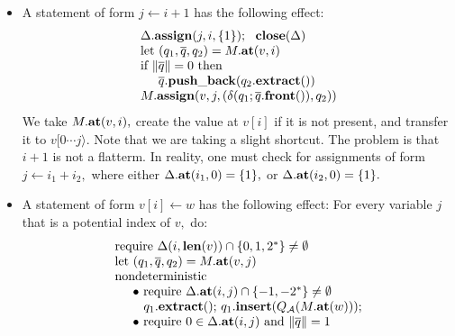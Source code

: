 \begin{itemize}
   If the triple at $ M. {\bf at}(v,i) $ has a value for
   $ v[i], $ we can use it. Otherwise, we create it first. 
\item
   A statement of form $ j \leftarrow i + 1 $ has the following effect:
   \[
      \begin{array}{l}
      \Delta. {\bf assign}( j,i, \{ 1 \} ); \ \ {\bf close}( \Delta ) \\
      {\rm let} \ ( q_1, \overline{q}, q_2 ) = M. {\bf at}(v,i) \\
      \mbox{if} \ \| \overline{q} \| = 0 \ \mbox{then} \\
      \hspace*{0.5cm} \overline{q}. {\bf push\_back}( q_2. {\bf extract}( )) \\
      M. {\bf assign}( v,j, ( \delta( q_1; \overline{q}. {\bf front}()), q_2 )) \\ 
      \end{array}
   \] 
   We take $ M.{\bf at}(v,i), $ create the value at $ v[i] $ if it is not
   present, and transfer it to $ v[ 0 \cdots j \rangle. $ 
   Note that we are taking a slight shortcut.
   The problem is that $ i + 1 $ is not a flatterm.
   In reality, one must check for assignments of form
   $ j \leftarrow i_1 + i_2, $ where either
   $ \Delta.{\bf at}(i_1,0) = \{ 1 \}, $ or
   $ \Delta.{\bf at}(i_2,0) = \{ 1 \}. $ 
\item
   A statement of form $ v[i] \leftarrow w $ has the following effect:
   For every variable $ j $ that is a potential index of $ v, $ do: 
   \[ 
      \begin{array}{l} 
         {\rm require} \ \Delta(i, {\bf len}(v)) \cap \{ 0,1,2^{*} \} \not = \emptyset \\
         {\rm let} \ ( q_1, \overline{q}, q_2 ) = M. {\bf at}(v,j) \\
         {\rm nondeterministic} \\ 
         \hspace*{0.5cm} \bullet \ 
              {\rm require} \ \Delta.{\bf at}( i,j ) \cap \{ -1, -2^{*} \} \not = \emptyset \\
         \hspace*{0.8cm} q_1. {\bf extract}( ); \,
                         q_1. {\bf insert}( Q_{\cal A}( M. {\bf at}(w))); \\
         \hspace*{0.5cm} \bullet \ {\rm require} \
             0 \in \Delta.{\bf at}(i,j) \mbox{ and } 
                 \| \overline{q} \| = 1 \\

\end{array}\]
\end{itemize}
